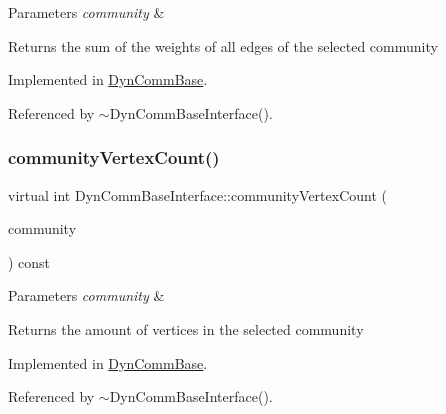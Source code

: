 \begin{DoxyParams}{Parameters}
{\em community} & \\
\hline
\end{DoxyParams}
\begin{DoxyReturn}{Returns}
the sum of the weights of all edges of the selected community 
\end{DoxyReturn}


Implemented in \hyperlink{classDynCommBase_a9e7f2493dd9f2381dbfbe94b91ac49f4}{Dyn\+Comm\+Base}.



Referenced by $\sim$\+Dyn\+Comm\+Base\+Interface().

\mbox{\label{classDynCommBaseInterface_a2b4c4a130a2de5eb6cd79af88969ef3c}} 
\subsubsection{\texorpdfstring{community\+Vertex\+Count()}{communityVertexCount()}}
{\footnotesize\ttfamily virtual int Dyn\+Comm\+Base\+Interface\+::community\+Vertex\+Count (\begin{DoxyParamCaption}\item[{\hyperlink{graphUndirectedGroupable_8h_a914da95c9ea7f14f4b7f875c36818556}{type\+Community}}]{community }\end{DoxyParamCaption}) const\hspace{0.3cm}{\ttfamily [pure virtual]}}


\begin{DoxyParams}{Parameters}
{\em community} & \\
\hline
\end{DoxyParams}
\begin{DoxyReturn}{Returns}
the amount of vertices in the selected community 
\end{DoxyReturn}


Implemented in \hyperlink{classDynCommBase_ad02f1853b63e1ceaf24b05cfdbcf7a49}{Dyn\+Comm\+Base}.



Referenced by $\sim$\+Dyn\+Comm\+Base\+Interface().

\mbox{\label{classDynCommBaseInterface_a9d6f5345d8cdf9e0d70b7a71bff8ade6}} 
